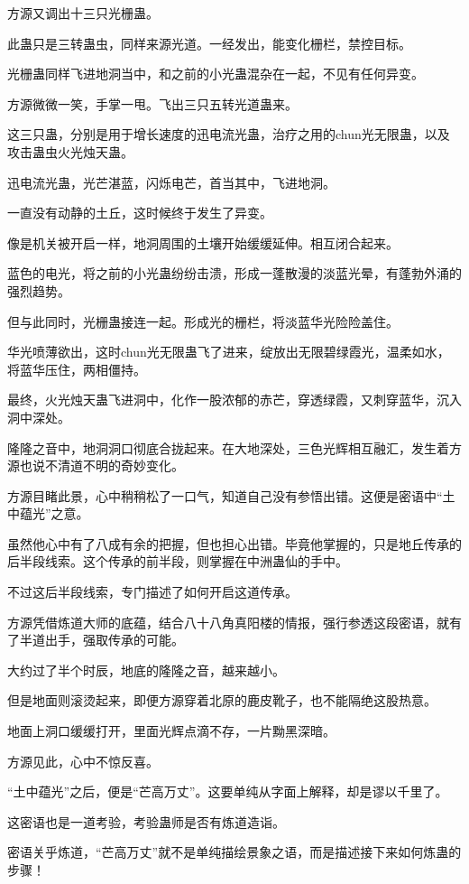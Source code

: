 \begin{this_body}
方源又调出十三只光栅蛊。

此蛊只是三转蛊虫，同样来源光道。一经发出，能变化栅栏，禁控目标。

光栅蛊同样飞进地洞当中，和之前的小光蛊混杂在一起，不见有任何异变。

方源微微一笑，手掌一甩。飞出三只五转光道蛊来。

这三只蛊，分别是用于增长速度的迅电流光蛊，治疗之用的chun光无限蛊，以及攻击蛊虫火光烛天蛊。

迅电流光蛊，光芒湛蓝，闪烁电芒，首当其中，飞进地洞。

一直没有动静的土丘，这时候终于发生了异变。

像是机关被开启一样，地洞周围的土壤开始缓缓延伸。相互闭合起来。

蓝色的电光，将之前的小光蛊纷纷击溃，形成一蓬散漫的淡蓝光晕，有蓬勃外涌的强烈趋势。

但与此同时，光栅蛊接连一起。形成光的栅栏，将淡蓝华光险险盖住。

华光喷薄欲出，这时chun光无限蛊飞了进来，绽放出无限碧绿霞光，温柔如水，将蓝华压住，两相僵持。

最终，火光烛天蛊飞进洞中，化作一股浓郁的赤芒，穿透绿霞，又刺穿蓝华，沉入洞中深处。

隆隆之音中，地洞洞口彻底合拢起来。在大地深处，三色光辉相互融汇，发生着方源也说不清道不明的奇妙变化。

方源目睹此景，心中稍稍松了一口气，知道自己没有参悟出错。这便是密语中“土中蕴光”之意。

虽然他心中有了八成有余的把握，但也担心出错。毕竟他掌握的，只是地丘传承的后半段线索。这个传承的前半段，则掌握在中洲蛊仙的手中。

不过这后半段线索，专门描述了如何开启这道传承。

方源凭借炼道大师的底蕴，结合八十八角真阳楼的情报，强行参透这段密语，就有了半道出手，强取传承的可能。

大约过了半个时辰，地底的隆隆之音，越来越小。

但是地面则滚烫起来，即便方源穿着北原的鹿皮靴子，也不能隔绝这股热意。

地面上洞口缓缓打开，里面光辉点滴不存，一片黝黑深暗。

方源见此，心中不惊反喜。

“土中蕴光”之后，便是“芒高万丈”。这要单纯从字面上解释，却是谬以千里了。

这密语也是一道考验，考验蛊师是否有炼道造诣。

密语关乎炼道，“芒高万丈”就不是单纯描绘景象之语，而是描述接下来如何炼蛊的步骤！


\end{this_body}
